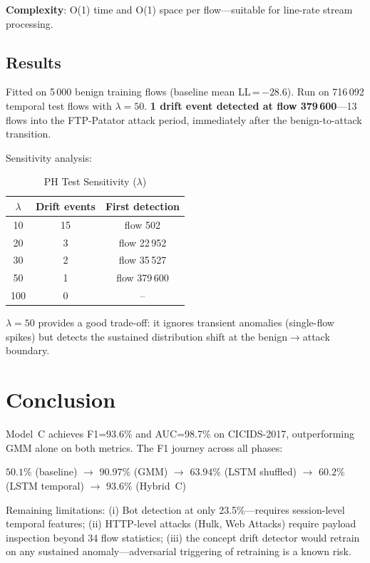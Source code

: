 \documentclass[conference]{IEEEtran}
\begin{document}
\textbf{Complexity}: O(1) time and O(1) space per flow---suitable for
line-rate stream processing.

\subsection{Results}

Fitted on 5\,000 benign training flows (baseline mean LL\,=\,$-28.6$).
Run on 716\,092 temporal test flows with $\lambda=50$.
\textbf{1 drift event detected at flow 379\,600}---13 flows into the
FTP-Patator attack period, immediately after the benign-to-attack
transition.

Sensitivity analysis:
\begin{table}[h]
\centering
\caption{PH Test Sensitivity ($\lambda$)}
\label{tab:ph}
\begin{tabular}{ccc}
\toprule
$\lambda$ & Drift events & First detection \\
\midrule
10 & 15 & flow 502 \\
20 &  3 & flow 22\,952 \\
30 &  2 & flow 35\,527 \\
50 &  1 & flow 379\,600 \\
100 & 0 & -- \\
\bottomrule
\end{tabular}
\end{table}

$\lambda=50$ provides a good trade-off: it ignores transient anomalies
(single-flow spikes) but detects the sustained distribution shift at the
benign$\to$attack boundary.

\section{Conclusion}

Model~C achieves F1=93.6\% and AUC=98.7\% on CICIDS-2017, outperforming
GMM alone on both metrics.  The F1 journey across all phases:
\begin{center}
$50.1\%$ (baseline) $\to$ $90.97\%$ (GMM) $\to$ $63.94\%$ (LSTM shuffled)
$\to$ $60.2\%$ (LSTM temporal) $\to$ $\mathbf{93.6\%}$ (Hybrid~C)
\end{center}

Remaining limitations: (i) Bot detection at only 23.5\%---requires
session-level temporal features; (ii) HTTP-level attacks (Hulk, Web
Attacks) require payload inspection beyond 34 flow statistics;
(iii) the concept drift detector would retrain on any sustained
anomaly---adversarial triggering of retraining is a known risk.
\end{document}
